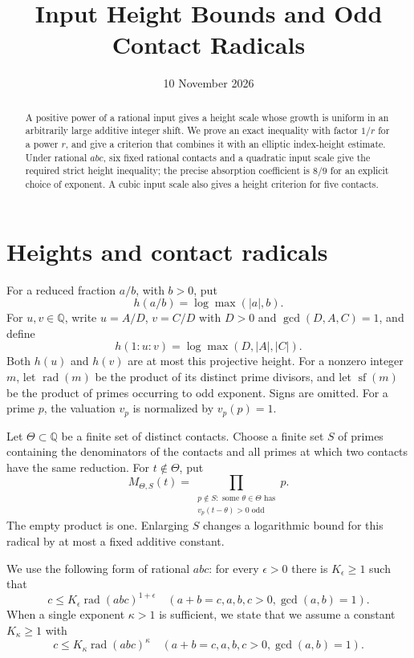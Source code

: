 \documentclass[11pt,a4paper]{article}
\title{Input Height Bounds and Odd Contact Radicals}
\author{}\date{10 November 2026}
\theoremstyle{remark}\newtheorem{remark}[theorem]{Remark}
\newcommand{\Q}{\mathbb Q}\newcommand{\Z}{\mathbb Z}
\DeclareMathOperator{\rad}{rad}
\DeclareMathOperator{\sfpart}{sf}
\begin{document}
\maketitle

\begin{abstract}
A positive power of a rational input gives a height scale whose
growth is uniform in an arbitrarily large additive integer shift.
We prove an exact inequality with factor $1/r$ for a power $r$,
and give a criterion that combines it with an elliptic index-height
estimate. Under rational $abc$, six fixed rational contacts and a
quadratic input scale give the required strict height inequality;
the precise absorption coefficient is $8/9$ for an explicit choice
of exponent. A cubic input scale also gives a height criterion for
five contacts.
\end{abstract}

\section{Heights and contact radicals}

For a reduced fraction $a/b$, with $b>0$, put
\[
                 h(a/b)=\log\max(|a|,b).
\]
For $u,v\in\Q$, write $u=A/D$, $v=C/D$ with
$D>0$ and $\gcd(D,A,C)=1$, and define
\[
                 h(1:u:v)=\log\max(D,|A|,|C|).
\]
Both $h(u)$ and $h(v)$ are at most this projective height.
For a nonzero integer $m$, let $\rad(m)$ be the product of
its distinct prime divisors, and let $\sfpart(m)$ be the
product of primes occurring to odd exponent. Signs are omitted.
For a prime $p$, the valuation $v_p$ is normalized by $v_p(p)=1$.

Let $\Theta\subset\Q$ be a finite set of distinct contacts.
Choose a finite set $S$ of primes containing the denominators of
the contacts and all primes at which two contacts have the same
reduction. For $t\notin\Theta$, put
\begin{equation}\label{eq:radical}
 M_{\Theta,S}(t)=
 \prod_{\substack{p\notin S:\text{ some }\theta\in\Theta\text{ has}\\
                 v_p(t-\theta)>0\text{ odd}}}p.
\end{equation}
The empty product is one. Enlarging $S$ changes a logarithmic
bound for this radical by at most a fixed additive constant.

We use the following form of rational $abc$: for every
$\epsilon>0$ there is $K_\epsilon\ge1$ such that
\[
 c\le K_\epsilon\rad(abc)^{1+\epsilon}
 \quad(a+b=c, a,b,c>0, \gcd(a,b)=1).
\]
When a single exponent $\kappa>1$ is sufficient, we state that
we assume a constant $K_\kappa\ge1$ with
\begin{equation}\label{eq:weakabc}
 c\le K_\kappa\rad(abc)^\kappa
 \quad(a+b=c, a,b,c>0, \gcd(a,b)=1).
\end{equation}
\end{document}
